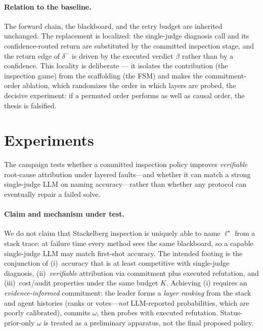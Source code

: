\documentclass[a4paper,fleqn]{cas-sc}
\begin{document}
\paragraph{Relation to the baseline.} The forward chain, the blackboard, and
the retry budget are inherited unchanged. The replacement is localized: the
single-judge diagnosis call and its confidence-routed return are substituted
by the committed inspection stage, and the return edge of $\delta^{-}$ is
driven by the executed verdict $\beta$ rather than by a confidence. This
locality is deliberate --- it isolates the contribution (the inspection game)
from the scaffolding (the FSM) and makes the commitment-order ablation, which
randomizes the order in which layers are probed, the decisive experiment: if a
permuted order performs as well as causal order, the thesis is falsified.

\section{Experiments}
\label{sec:experiments}

The campaign tests whether a committed inspection policy improves
\emph{verifiable} root-cause attribution under layered faults---and whether
it can match a strong single-judge LLM on naming accuracy---rather than
whether any protocol can eventually repair a failed solve.
\paragraph{Claim and mechanism under test.}
We do not claim that Stackelberg inspection is uniquely able to name
$\ell^{\star}$ from a stack trace: at failure time every method sees the same
blackboard, so a capable single-judge LLM may match first-shot accuracy.
The intended footing is the conjunction of (i)~accuracy that is at least
competitive with single-judge diagnosis, (ii)~\emph{verifiable} attribution
via commitment plus executed refutation, and (iii)~cost/audit properties
under the same budget $K$. Achieving (i) requires an
\emph{evidence-informed} commitment: the leader forms a \emph{layer ranking}
from the stack and agent histories (ranks or votes---\emph{not} LLM-reported
probabilities, which are poorly calibrated), commits $\omega$, then probes
with executed refutation. Status-prior-only $\omega$ is treated as a
preliminary apparatus, not the final proposed policy.
\end{document}
